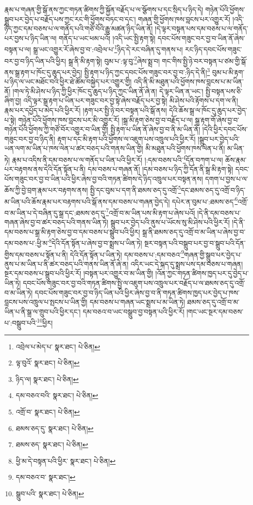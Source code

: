 རྣམ་པ་གཞན་གྱི་སྒོ་ནས་ཀྱང་གཏན་ཚིགས་ཀྱི་སྐྱོན་བརྗོད་པ་ལ་སྩོགས་པ་དང་སྲིད་པ་ཉིད་དེ། གཉེན་པོའི་ཕྱོགས་སྒྲུབ་པར་བྱེད་པ་བརྗོད་པས་ཀྱང་རང་གི་ཕྱོགས་བཏང་བ་དང་། གཞན་གྱི་ཕྱོགས་ཁས་བླངས་པར་འགྱུར་རོ། །འདི་ཉིད་ཀྱང་དམ་བཅས་པ་ལ་གནོད་པའི་གཙོ་བོའི་རྒྱུ་མཚན་ཉིད་ཡིན་ནོ། །དེ་ལྟར་བསྟན་པས་དམ་བཅས་པ་ལ་གནོད་པར་བྱས་པ་ཉིད་ཡིན་ལ། གནོད་པ་ཡང་ཕམ་པའོ། །འདི་ཡང་སྤྱི་རྟག་སྟེ། དབང་པོས་གཟུང་བར་བྱ་བ་ཡིན་ནོ་ཞེས་བསྟན་པ་ལ། སྒྲ་ཡང་འགྱུར་རོ་ཞེས་བྱ་བ་:འབྲེལ་པ་\footnote{འབྲེལ་པ་མེད་པ་  སྣར་ཐང་།  པེ་ཅིན། }ཉིད་དེ་རང་བཞིན་དུ་གནས་པ། རང་ཉིད་དབང་པོས་གཟུང་བར་བྱ་བ་ཉིད་ཡིན་པའི་ཕྱིར། སྒྲ་ནི་མི་རྟག་སྟེ། བུམ་པ་:ལྟ་བུ་\footnote{ལྟ་བུའོ་  སྣར་ཐང་།  པེ་ཅིན། }ཞེས་སྨྲ་བ། གང་གིས་སྤྱི་ཉེ་བར་བསྟན་པ་ཙམ་གྱི་སྒོ་ནས་སྒྲ་རྟག་པ་ཁོང་དུ་ཆུད་པར་བྱེད། སྤྱི་རྟག་པ་ཉིད་ཀྱང་དབང་པོས་གཟུང་བར་བྱ་བ་:ཉིད་དེ་ནི།\footnote{ཉིད་ལ།  སྣར་ཐང་།  པེ་ཅིན། } བུམ་པ་མི་རྟག་པ་ཉིད་ལ་ཡང་མཐོང་བའི་ཕྱིར་ཐེ་ཚོམ་བསྐྱེད་པར་འགྱུར་གྱི། འདི་ནི་མི་མཐུན་པའི་ཕྱོགས་ཁས་བླངས་པ་མ་ཡིན་ནོ། །གལ་ཏེ་མི་ཤེས་པ་ཉིད་ཀྱི་ཕྱིར་ཁོང་དུ་ཆུད་པ་ཉིད་ཀྱང་ཡིན་ནོ་ཞེ་ན། དེ་ལྟར་ཡིན་ན་ཡང་། སྤྱི་བསྟན་པས་ཅི་ཞིག་བྱ། འདི་ལྟར་སྒྲ་རྟག་པ་ཡིན་པར་གཟུང་བར་བྱ་སྟེ་ཞེས་བརྗོད་པར་བྱ་སྟེ། མི་ཤེས་པའི་རྟོགས་པ་དག་ལ་ནི། རྣམ་པར་དཔྱོད་པ་མེད་པའི་ཕྱིར་རོ། །རྟག་པར་སྤྱི་ཉེ་བར་བསྟན་པའི་སྒོ་ནས། དེའི་ཆོས་སྒྲ་ལ་ཁོང་དུ་ཆུད་པར་བྱེད་པ་སྟེ། གཉེན་པོའི་ཕྱོགས་ཁས་བླངས་པར་མི་འགྱུར་རོ། །སྒྲ་མི་རྟག་ཅེས་བྱ་བ་བརྗོད་པ་ལ། སྒྲ་རྟག་གོ་ཞེས་བྱ་བ་གཉེན་པོའི་ཕྱོགས་ཀྱི་གཙོ་བོར་འགྱུར་བ་ཡིན་གྱི། སྤྱི་རྟག་པ་ཡིན་ནོ་ཞེས་བྱ་བ་ནི་མ་ཡིན་ནོ། །དེའི་ཕྱིར་དབང་པོས་གཟུང་བར་བྱ་བ་ཉིད་ནི། རྟག་པ་དང་མི་རྟག་པའི་ཕྱོགས་ལ་འཇུག་པས་འཁྲུལ་པའི་ཕྱིར་རོ། །སྒྲུབ་པར་བྱེད་པའི་ཡན་ལག་མ་ཡིན་པ་ཁས་ལེན་པ་ཚར་བཅད་པའི་གནས་ཡིན་གྱི། མི་མཐུན་པའི་ཕྱོགས་ཁས་ལེན་པ་ནི། མ་ཡིན་ཏེ། རྣམ་པ་འདིས་ནི་དམ་བཅས་པ་ལ་གནོད་པ་ཡིན་པའི་ཕྱིར་རོ། །:དམ་བཅས་པའི་\footnote{དམ་བཅའ་བའི་  སྣར་ཐང་།  པེ་ཅིན། }དོན་བཀག་པ་ལ། ཆོས་རྣམ་པར་བརྟགས་ནས་དེའི་དོན་སྟོན་པ་ནི། དམ་བཅས་པ་གཞན་ནོ། །དམ་བཅས་པ་ཉིད་ཀྱི་དོན་ནི་སྒྲ་མི་རྟག་སྟེ། དབང་པོས་གཟུང་བར་བྱ་བ་ཡིན་པའི་ཕྱིར་ཞེས་བྱ་བའི་གཏན་ཚིགས་དེ་ཉིད་འཁྲུལ་པར་བསྟན་ནས། དགག་པ་བྱས་པ་ལ་ཆོས་ཀྱི་བྱེ་བྲག་རྣམ་པར་བརྟགས་ནས། སྤྱི་དང་བུམ་པ་དག་ནི་ཐམས་ཅད་དུ་འགྲོ་\footnote{འགྲོ་བ་  སྣར་ཐང་།  པེ་ཅིན། }དང་ཐམས་ཅད་དུ་འགྲོ་བ་ཉིད་མ་ཡིན་པའི་ཆོས་རྣམ་པར་བརྟགས་པའི་སྒོ་ནས་དམ་བཅས་པ་གཞན་བྱེད་དེ། དཔེར་ན་བུམ་པ་:ཐམས་ཅད་\footnote{ཐམས་ཅད་དུ་  སྣར་ཐང་།  པེ་ཅིན། }འགྲོ་བ་མ་ཡིན་པ་དེ་བཞིན་དུ་སྒྲ་དང་:ཐམས་ཅད་དུ་\footnote{ཐམས་ཅད་  སྣར་ཐང་།  པེ་ཅིན། }འགྲོ་བ་མ་ཡིན་པས་མི་རྟག་པ་ཞེས་པའོ། །དེ་ནི་དམ་བཅས་པ་གཞན་ཞེས་བྱ་བ་ཚར་བཅད་པའི་གནས་ཡིན་ཏེ། སྒྲུབ་པར་བྱེད་པའི་ནུས་པ་ཡོངས་སུ་མི་ཤེས་པའི་ཕྱིར་རོ། །དེ་ནི་དམ་བཅས་པ་སྒྲ་མི་རྟག་ཅེས་བྱ་བ་དམ་བཅས་པ་སྒྲུབ་པའི་ཕྱིར། སྒྲ་ནི་ཐམས་ཅད་དུ་འགྲོ་བ་མ་ཡིན་པ་ཞེས་བྱ་བ་དམ་བཅས་པ་:ཕྱི་མ་\footnote{ཕྱི་མ་དེ་བསྟན་པའི་ཕྱིར་  སྣར་ཐང་།  པེ་ཅིན། }དེའི་དོན་སྟོན་པ་ཞེས་བྱ་བ་སྨྲས་པ་ཡིན་ཏེ། སྔར་བསྟན་པའི་བསྒྲུབ་པར་བྱ་བ་སྒྲུབ་པའི་དོན་གྱིས་དམ་བཅས་པ་སྟོན་པ་ནི། དེའི་དོན་སྟོན་པ་ཡིན་ཏེ། དམ་བཅས་པ་:དམ་བཅའ་\footnote{དམ་བཅའ་བ་  སྣར་ཐང་། }གཞན་གྱི་སྒྲུབ་པར་བྱེད་པ་ནུས་པ་མ་ཡིན་པ་ནི་ཚར་བཅད་པའི་གནས་ཡིན་ནོ་ཞེ་ན། འདིར་ཡང་དེ་སྐད་དུ་སྨྲས་པས་དམ་བཅས་པ་གཞན། སྔར་དམ་བཅས་པ་སྒྲུབ་པའི་ཕྱིར་རོ། །བསྟན་པར་འགྱུར་བ་མ་ཡིན་གྱི། །འོན་ཀྱང་གཏན་ཚིགས་ཁྱད་པར་དུ་བྱེད་པ་ཡིན་ཏེ། དབང་པོས་གཟུང་བར་བྱ་བའི་གཏན་ཚིགས་སྤྱི་ལ་འཇུག་པས་འཁྲུལ་པར་བརྗོད་པ་ལ་ཐམས་ཅད་དུ་འགྲོ་བ་མ་ཡིན་ཏེ། དབང་པོས་གཟུང་བར་བྱ་བ་ཉིད་ཡིན་པའི་ཕྱིར་ཞེས་བྱ་བ་ནི་གཏན་ཚིགས་ཁྱད་པར་བྱེད་པ་ཁས་བླངས་པས་འཁྲུལ་པ་སྤངས་པ་ཡིན་གྱི། དམ་བཅས་པ་གཞན་ཡང་སྨྲས་པ་མ་ཡིན་ཏེ། ཐམས་ཅད་དུ་འགྲོ་བ་མ་ཡིན་པ་ནི་སྒྲ་ལ་གྲུབ་པའི་ཕྱིར་དང་། དམ་བཅའ་བ་ཡང་བསྒྲུབ་བྱ་བསྟན་པའི་ཕྱིར་རོ། །གང་ཡང་སྔར་དམ་བཅས་པ་:བསྒྲུབ་པའི་\footnote{སྒྲུབ་པའི་  སྣར་ཐང་།  པེ་ཅིན། }ཕྱིར། 